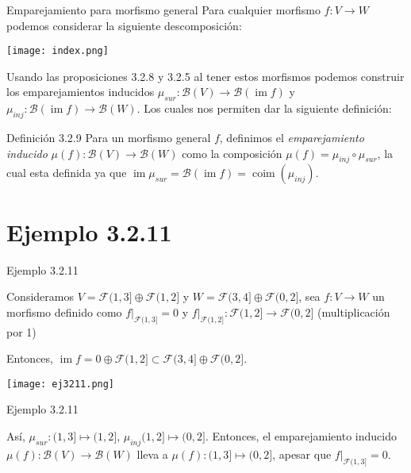 \documentclass{beamer}
\newcommand{\calB}{{\mathcal{B}}}
\DeclareMathOperator{\coim}{coim}
\DeclareMathOperator{\im}{im}
\newcommand{\restr}{\big|}  %
\def\F{{\mathcal F}}
\begin{document}
\begin{frame}{Emparejamiento para morfismo general}
Para cualquier morfismo \(f: V \to W\) podemos considerar la siguiente descomposición: 
\begin{center}
\texttt{[image: index.png]}
\end{center}
\pause
Usando las proposiciones 3.2.8 y 3.2.5 al tener estos morfismos podemos construir los emparejamientos inducidos $\mu_{sur}: \calB(V) \to \calB(\im f)$ y
	$\mu_{inj}: \calB(\im f)\to \calB(W)$. Los cuales nos permiten dar la siguiente definición:
 \pause
 \begin{block}{Definición 3.2.9}
Para un morfismo general $f$, definimos el \emph{emparejamiento inducido} $\mu(f) : \calB (V) \to \calB (W)$ como la composición
	$\mu(f) = \mu_{inj} \circ \mu_{sur}$,
 la cual esta definida ya que $\im \mu_{sur} = \calB (\im f) = \coim (\mu_{inj})$.
 \end{block}

\end{frame}



\section{Ejemplo 3.2.11}
\begin{frame}{Ejemplo 3.2.11}

Consideramos $V = \F (1,3] \oplus \F (1,2]$ y $W = \F (3,4] \oplus \F (0,2]$, sea $f: V \to W$ un morfismo definido como
	$f\restr_{\F(1,3]} = 0$ y
	$f \restr_{\F(1,2]} : \F(1,2] \to \F(0,2]$ (multiplicación por 1)
	
	Entonces, $\im f = 0 \oplus \F(1,2] \subset \F(3,4] \oplus \F(0,2]$. 
 \pause
 \begin{center}
\texttt{[image: ej3211.png]}
\end{center}

\end{frame}

\begin{frame}{Ejemplo 3.2.11}

Así, $\mu_{sur} : (1,3] \mapsto (1,2]$, $\mu_{inj} (1,2] \mapsto (0,2]$.
	Entonces, el emparejamiento inducido $\mu(f): \calB(V) \to \calB(W)$ lleva a $\mu (f) : (1,3] \mapsto (0,2]$, apesar que $f \restr_{\F(1,3]} = 0$.
\end{frame}
\end{document}
